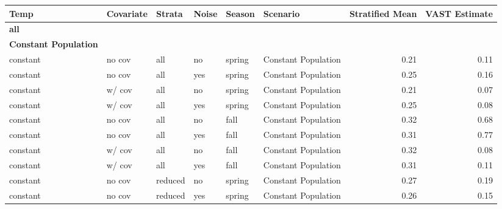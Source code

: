 \documentclass[
  12pt,
]{article}
\begin{document}
\begin{table}
\centering\begingroup\fontsize{10}{12}\selectfont

\begin{tabular}{l|l|l|l|l|l|r|r}
\hline
Temp & Covariate & Strata & Noise & Season & Scenario & Stratified Mean & VAST Estimate\\
\hline
\multicolumn{1}{l}{\textbf{all}}\\
\hline
\multicolumn{1}{l}{\textbf{Constant Population}}\\
\hline
\hspace{1em}\hspace{1em}constant & no cov & all & no & spring & Constant Population & 0.21 & 0.11\\
\hline
\hspace{1em}\hspace{1em}constant & no cov & all & yes & spring & Constant Population & 0.25 & 0.16\\
\hline
\hspace{1em}\hspace{1em}constant & w/ cov & all & no & spring & Constant Population & 0.21 & 0.07\\
\hline
\hspace{1em}\hspace{1em}constant & w/ cov & all & yes & spring & Constant Population & 0.25 & 0.08\\
\hline
\hspace{1em}\hspace{1em}constant & no cov & all & no & fall & Constant Population & 0.32 & 0.68\\
\hline
\hspace{1em}\hspace{1em}constant & no cov & all & yes & fall & Constant Population & 0.31 & 0.77\\
\hline
\hspace{1em}\hspace{1em}constant & w/ cov & all & no & fall & Constant Population & 0.32 & 0.08\\
\hline
\hspace{1em}\hspace{1em}constant & w/ cov & all & yes & fall & Constant Population & 0.31 & 0.11\\
\hline
\hspace{1em}\hspace{1em}constant & no cov & reduced & no & spring & Constant Population & 0.27 & 0.19\\
\hline
\hspace{1em}\hspace{1em}constant & no cov & reduced & yes & spring & Constant Population & 0.26 & 0.15\\

\end{tabular}
\end{table}
\end{document}
